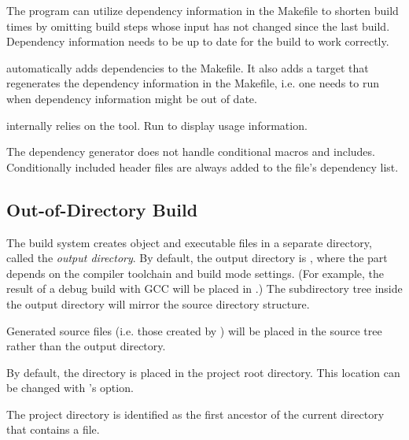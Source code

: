 The  program can utilize dependency information in the Makefile
to shorten build times by omitting build steps whose input has not changed
since the last build. Dependency information needs to be up to date for the
build to work correctly.

 automatically adds dependencies to the
Makefile. It also adds a  target
that regenerates the dependency information in the Makefile, i.e. one needs
to run  when dependency information might be out of date.

 internally relies on the  tool. Run
 to display usage information.

\begin{note}
The dependency generator does not handle conditional macros and includes.
Conditionally included header files are always added to the file's dependency list.
\end{note}


\subsection{Out-of-Directory Build}
\label{sec:build-sim-progs:out-of-directory-build}

The build system creates object and executable files in a separate directory, called the
\textit{output directory}. By default, the output directory is ,
where the  part depends on the compiler toolchain and build mode settings.
(For example, the result of a debug build with GCC will be placed in .)
The subdirectory tree inside the output directory will mirror the source directory
structure.

\begin{note}
Generated source files (i.e. those created by ) will be placed in the
source tree rather than the output directory.
\end{note}

By default, the  directory is placed in the project root directory. This location
can be changed with 's  option.


\begin{note}
The project directory is identified as the first ancestor of the current directory
that contains a  file.
\end{note}


